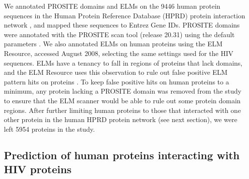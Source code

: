 We annotated PROSITE domains and ELMs on the 9446 human protein
sequences in the Human Protein Reference Database (HPRD) protein
interaction network \cite{prasad08}, and mapped these sequences to
Entrez Gene IDs. PROSITE domains were annotated with the PROSITE scan
tool (release 20.31) using the default parameters
\cite{decastro06}. We also annotated ELMs on human proteins using the
ELM Resource, accessed August 2008, selecting the same settings used
for the HIV sequences. ELMs have a tenancy to fall in regions of
proteins that lack domains, and the ELM Resource uses this observation
to rule out false positive ELM pattern hits on proteins
\cite{puntervoll03,neduva06nuc,edwards07}. To keep false positive hits
on human proteins to a minimum, any protein lacking a PROSITE domain
was removed from the study to ensure that the ELM scanner would be
able to rule out some protein domain regions. After further limiting
human proteins to those that interacted with one other protein in the
human HPRD protein network (see next section), we were left 5954
proteins in the study.


\subsection{Prediction of human proteins interacting with HIV proteins}

